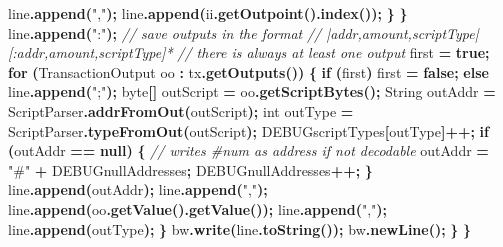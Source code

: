\documentclass[
  italian,
  openany]{book}
\newenvironment{Shaded}{\begin{snugshade}}{\end{snugshade}}
\newcommand{\BuiltInTok}[1]{#1}
\newcommand{\CommentTok}[1]{\textcolor[rgb]{0.56,0.35,0.01}{\textit{#1}}}
\newcommand{\ControlFlowTok}[1]{\textcolor[rgb]{0.13,0.29,0.53}{\textbf{#1}}}
\newcommand{\DataTypeTok}[1]{\textcolor[rgb]{0.13,0.29,0.53}{#1}}
\newcommand{\FunctionTok}[1]{\textcolor[rgb]{0.13,0.29,0.53}{\textbf{#1}}}
\newcommand{\KeywordTok}[1]{\textcolor[rgb]{0.13,0.29,0.53}{\textbf{#1}}}
\newcommand{\NormalTok}[1]{#1}
\newcommand{\OperatorTok}[1]{\textcolor[rgb]{0.81,0.36,0.00}{\textbf{#1}}}
\newcommand{\StringTok}[1]{\textcolor[rgb]{0.31,0.60,0.02}{#1}}
\begin{document}
\begin{Shaded}
\begin{Highlighting}[]
\NormalTok{                line}\OperatorTok{.}\FunctionTok{append}\OperatorTok{(}\StringTok{","}\OperatorTok{);}
\NormalTok{                line}\OperatorTok{.}\FunctionTok{append}\OperatorTok{(}\NormalTok{ii}\OperatorTok{.}\FunctionTok{getOutpoint}\OperatorTok{().}\FunctionTok{index}\OperatorTok{());}
            \OperatorTok{\}}
        \OperatorTok{\}}
\NormalTok{        line}\OperatorTok{.}\FunctionTok{append}\OperatorTok{(}\StringTok{":"}\OperatorTok{);}
        \CommentTok{// save outputs in the format}
        \CommentTok{// |addr,amount,scriptType|[:addr,amount,scriptType]*}
        \CommentTok{// there is always at least one output}
\NormalTok{        first }\OperatorTok{=} \KeywordTok{true}\OperatorTok{;}
        \ControlFlowTok{for} \OperatorTok{(}\NormalTok{TransactionOutput oo }\OperatorTok{:}\NormalTok{ tx}\OperatorTok{.}\FunctionTok{getOutputs}\OperatorTok{())} \OperatorTok{\{}
            \ControlFlowTok{if} \OperatorTok{(}\NormalTok{first}\OperatorTok{)}\NormalTok{ first }\OperatorTok{=} \KeywordTok{false}\OperatorTok{;}
            \ControlFlowTok{else}\NormalTok{ line}\OperatorTok{.}\FunctionTok{append}\OperatorTok{(}\StringTok{";"}\OperatorTok{);}
            \DataTypeTok{byte}\OperatorTok{[]}\NormalTok{ outScript }\OperatorTok{=}\NormalTok{ oo}\OperatorTok{.}\FunctionTok{getScriptBytes}\OperatorTok{();}
            \BuiltInTok{String}\NormalTok{ outAddr }\OperatorTok{=}\NormalTok{ ScriptParser}\OperatorTok{.}\FunctionTok{addrFromOut}\OperatorTok{(}\NormalTok{outScript}\OperatorTok{);}
            \DataTypeTok{int}\NormalTok{ outType }\OperatorTok{=}\NormalTok{ ScriptParser}\OperatorTok{.}\FunctionTok{typeFromOut}\OperatorTok{(}\NormalTok{outScript}\OperatorTok{);}
\NormalTok{            DEBUGscriptTypes}\OperatorTok{[}\NormalTok{outType}\OperatorTok{]++;}
            \ControlFlowTok{if} \OperatorTok{(}\NormalTok{outAddr }\OperatorTok{==} \KeywordTok{null}\OperatorTok{)} \OperatorTok{\{}
                \CommentTok{// writes \textquotesingle{}\#num\textquotesingle{} as address if not decodable}
\NormalTok{                outAddr }\OperatorTok{=} \StringTok{"\#"} \OperatorTok{+}\NormalTok{ DEBUGnullAddresses}\OperatorTok{;}
\NormalTok{                DEBUGnullAddresses}\OperatorTok{++;}
            \OperatorTok{\}}
\NormalTok{            line}\OperatorTok{.}\FunctionTok{append}\OperatorTok{(}\NormalTok{outAddr}\OperatorTok{);}
\NormalTok{            line}\OperatorTok{.}\FunctionTok{append}\OperatorTok{(}\StringTok{","}\OperatorTok{);}
\NormalTok{            line}\OperatorTok{.}\FunctionTok{append}\OperatorTok{(}\NormalTok{oo}\OperatorTok{.}\FunctionTok{getValue}\OperatorTok{().}\FunctionTok{getValue}\OperatorTok{());}
\NormalTok{            line}\OperatorTok{.}\FunctionTok{append}\OperatorTok{(}\StringTok{","}\OperatorTok{);}
\NormalTok{            line}\OperatorTok{.}\FunctionTok{append}\OperatorTok{(}\NormalTok{outType}\OperatorTok{);}
        \OperatorTok{\}}
\NormalTok{        bw}\OperatorTok{.}\FunctionTok{write}\OperatorTok{(}\NormalTok{line}\OperatorTok{.}\FunctionTok{toString}\OperatorTok{());}
\NormalTok{        bw}\OperatorTok{.}\FunctionTok{newLine}\OperatorTok{();}
    \OperatorTok{\}}
\OperatorTok{\}}
\end{Highlighting}
\end{Shaded}
\end{document}
